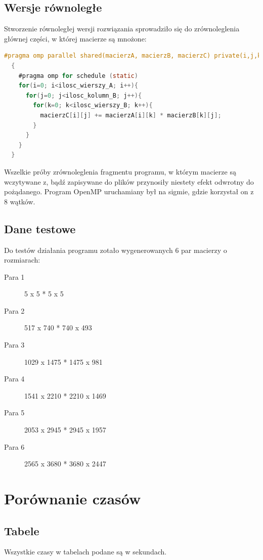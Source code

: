 \documentclass[a4paper]{article}
\begin{document}
\subsection{Wersje równoległe}
Stworzenie równoległej wersji rozwiązania sprowadziło się do zrównoleglenia głównej części, w której macierze są mnożone: 
\begin{lstlisting}[language=C,frame=lines,keywordstyle=\color{red}\bfseries
]
#pragma omp parallel shared(macierzA, macierzB, macierzC) private(i,j,k)
  {
    #pragma omp for schedule (static)
    for(i=0; i<ilosc_wierszy_A; i++){
      for(j=0; j<ilosc_kolumn_B; j++){
        for(k=0; k<ilosc_wierszy_B; k++){
          macierzC[i][j] += macierzA[i][k] * macierzB[k][j];
        }
      }
    }
  }
\end{lstlisting}
Wszelkie próby zrównoleglenia fragmentu programu, w którym macierze są wczytywane z, bądź zapisywane do plików przynosiły niestety efekt odwrotny do pożądanego. Program OpenMP uruchamiany był na sigmie, gdzie korzystał on z  8 wątków.

\subsection{Dane testowe}
Do testów działania programu zotało wygenerowanych 6 par macierzy o rozmiarach: 
\begin{description}
  \item[Para 1] 5    x  5    * 5    x  5
  \item[Para 2] 517  x  740  * 740  x  493
  \item[Para 3] 1029 x  1475 * 1475 x  981
  \item[Para 4] 1541 x  2210 * 2210 x  1469
  \item[Para 5] 2053 x  2945 * 2945 x  1957
  \item[Para 6] 2565 x  3680 * 3680 x  2447
\end{description}

\section{Porównanie czasów}
\subsection{Tabele}
Wszystkie czasy w tabelach podane są w sekundach.
\end{document}
